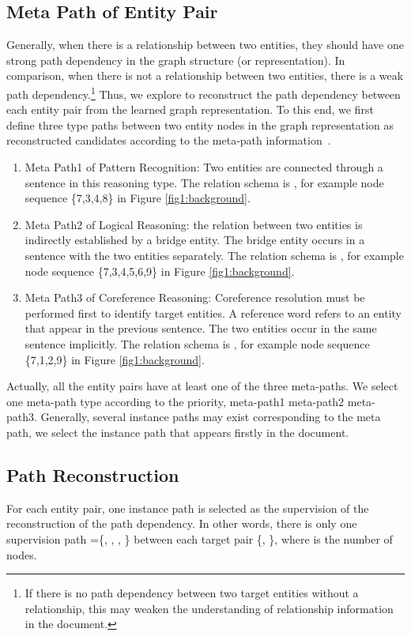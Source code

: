 \documentclass[letterpaper]{article} \usepackage{aaai21}  \usepackage{times}  \usepackage{helvet} \usepackage{courier}  \usepackage[hyphens]{url}  \usepackage{graphicx} \urlstyle{rm} \def\UrlFont{\rm}  \usepackage{natbib}  \usepackage{caption} \frenchspacing  \setlength{\pdfpagewidth}{8.5in}  \setlength{\pdfpageheight}{11in}  \usepackage{amsmath}
\begin{document}
\subsection{Meta Path of Entity Pair}
Generally, when there is a relationship between two entities, they should have one strong path dependency in the graph structure (or representation).
In comparison, when there is not a relationship between two entities, there is a weak path dependency.\footnote{If there is no path dependency between two target entities without a relationship, this may weaken the understanding of relationship information in the document.}
Thus, we explore to reconstruct the path dependency between each entity pair from the learned graph representation.
To this end, we first define three type paths between two entity nodes in the graph representation as reconstructed candidates according to the meta-path information~\cite{Sun2013MiningHI}.
\begin{enumerate}
\item[1)] Meta Path1 of Pattern Recognition: Two entities are connected through a sentence in this reasoning type. The relation schema is , for example node sequence \{7,3,4,8\} in Figure \ref{fig1:background}.

\item[2)] Meta Path2 of Logical Reasoning: the relation between two entities is indirectly established by a bridge entity. The bridge entity occurs in a sentence with the two entities separately. The relation schema is , for example node sequence \{7,3,4,5,6,9\} in Figure \ref{fig1:background}.

\item[3)] Meta Path3 of Coreference Reasoning: Coreference resolution must be performed first to identify target entities. A reference word refers to an entity that appear in the previous sentence. The two entities occur in the same sentence implicitly. The relation schema is , for example node sequence \{7,1,2,9\} in Figure \ref{fig1:background}.
\end{enumerate}
Actually, all the entity pairs have at least one of the three meta-paths. We select one meta-path type according to the priority, meta-path1  meta-path2  meta-path3.
Generally, several instance paths may exist corresponding to the meta path, we select the instance path that appears firstly in the document.






\subsection{Path Reconstruction}
For each entity pair, one instance path is selected as the supervision of the reconstruction of the path dependency.
In other words, there is only one supervision path =\{, , , \} between each target pair \{, \}, where  is the number of nodes.
\end{document}
